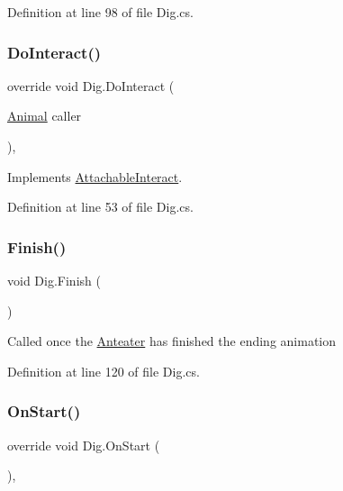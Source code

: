 Definition at line 98 of file Dig.\+cs.

\mbox{\label{class_dig_a1b5c5ca71b632a658f9f1a0bd5e40658}} 
\subsubsection{\texorpdfstring{Do\+Interact()}{DoInteract()}}
{\footnotesize\ttfamily override void Dig.\+Do\+Interact (\begin{DoxyParamCaption}\item[{\mbox{\hyperlink{class_animal}{Animal}}}]{caller }\end{DoxyParamCaption})\hspace{0.3cm}{\ttfamily [protected]}, {\ttfamily [virtual]}}



Implements \mbox{\hyperlink{class_attachable_interact_a9b07a54f1dbb96777c4bd287dfe438e3}{Attachable\+Interact}}.



Definition at line 53 of file Dig.\+cs.

\mbox{\label{class_dig_a41a34352c7a9451667d16ae3bc8adfee}} 
\subsubsection{\texorpdfstring{Finish()}{Finish()}}
{\footnotesize\ttfamily void Dig.\+Finish (\begin{DoxyParamCaption}{ }\end{DoxyParamCaption})}



Called once the \mbox{\hyperlink{class_anteater}{Anteater}} has finished the ending animation 



Definition at line 120 of file Dig.\+cs.

\mbox{\label{class_dig_a4363c202ea7096a10548d4fc5cb53c70}} 
\subsubsection{\texorpdfstring{On\+Start()}{OnStart()}}
{\footnotesize\ttfamily override void Dig.\+On\+Start (\begin{DoxyParamCaption}{ }\end{DoxyParamCaption})\hspace{0.3cm}{\ttfamily [protected]}, {\ttfamily [virtual]}}



